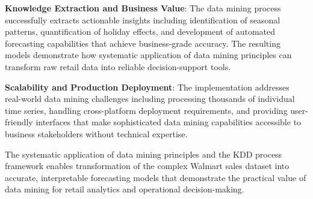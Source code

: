 \textbf{Knowledge Extraction and Business Value}: The data mining process successfully extracts actionable insights including identification of seasonal patterns, quantification of holiday effects, and development of automated forecasting capabilities that achieve business-grade accuracy. The resulting models demonstrate how systematic application of data mining principles can transform raw retail data into reliable decision-support tools.

\textbf{Scalability and Production Deployment}: The implementation addresses real-world data mining challenges including processing thousands of individual time series, handling cross-platform deployment requirements, and providing user-friendly interfaces that make sophisticated data mining capabilities accessible to business stakeholders without technical expertise.

The systematic application of data mining principles and the KDD process framework enables transformation of the complex Walmart sales dataset into accurate, interpretable forecasting models that demonstrate the practical value of data mining for retail analytics and operational decision-making.

